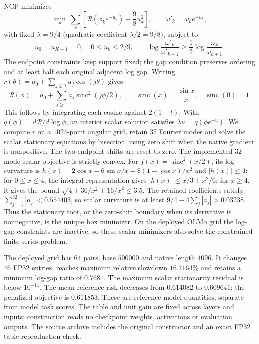 NCP minimizes
\begin{equation}
\min_u\ \sum_k\left[\mathcal R(\phi_ke^{-u_k})+\frac98u_k^2\right],
\qquad \omega'_k=\omega_ke^{-u_k},
\label{eq:ncp-main}
\end{equation}
with fixed $\lambda=9/4$ (quadratic coefficient $\lambda/2=9/8$), subject to
\begin{equation}
u_0=u_{K-1}=0,\quad 0\le u_k\le 2/9,\qquad
\log\frac{\omega'_k}{\omega'_{k+1}}
 \ge\frac12\log\frac{\omega_k}{\omega_{k+1}}.
\label{eq:ncp-constraints}
\end{equation}
The endpoint constraints keep support fixed; the gap condition preserves
ordering and at least half each original adjacent log gap.
Writing $r(\theta)=a_0+\sum_{j\ge1}a_j\cos(j\theta)$ gives
\begin{equation}
\mathcal R(\phi)=a_0+\sum_{j\ge1}a_j
 \operatorname{sinc}^2(j\phi/2),\qquad
\operatorname{sinc}(x)=\frac{\sin x}{x},\quad\operatorname{sinc}(0)=1.
\label{eq:ncp-fourier}
\end{equation}
This follows by integrating each cosine against $2(1-t)$.
With $q(\phi)=d\mathcal R/d\log\phi$, an interior scalar solution satisfies
$\lambda u=q(\phi e^{-u})$. We compute $r$ on a $1024$-point angular grid,
retain $32$ Fourier modes and solve the scalar stationary equations by
bisection, using zero shift when the native gradient is nonpositive. The two
endpoint shifts are reset to zero. The implemented $32$-mode scalar objective is strictly convex. For
$f(x)=\operatorname{sinc}^2(x/2)$, its log-curvature is
$h(x)=2\cos x-6\sin x/x+8(1-\cos x)/x^2$ and $|h(x)|\le4$:
for $0\le x\le4$, the integral representation gives
$|h(x)|\le x/3+x^2/6$; for $x\ge4$, it gives the bound
$\sqrt{4+36/x^2}+16/x^2\le3.5$. The retained coefficients satisfy
$\sum_{j=1}^{32}|a_j|<0.554403$, so scalar curvature is at least
$9/4-4\sum_j|a_j|>0.03238$. Thus the stationary root, or the zero-shift
boundary when its derivative is nonnegative, is the unique box minimizer.
On the deployed OLMo grid the log-gap constraints are inactive, so these
scalar minimizers also solve the constrained finite-series problem.

The deployed grid has $64$ pairs, base $500000$ and native length $4096$.
It changes $46$ FP32 entries, reaches maximum relative slowdown $16.7164\%$
and retains a minimum log-gap ratio of $0.7681$. The maximum scalar stationarity
residual is below $10^{-11}$. The mean reference risk decreases from
$0.614082$ to $0.609641$; the penalized objective is $0.611853$.
These are reference-model quantities, separate from model task scores.
The table and unit gain are fixed across layers and inputs; construction reads
no checkpoint weights, activations or evaluation outputs. The source archive
includes the original constructor and an exact FP32 table reproduction check.

